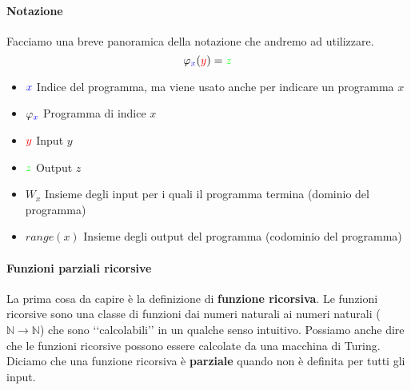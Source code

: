 \documentclass[a4paper,oneside]{scrbook}
\newcommand{\blue}[1]{\textcolor{blue}{#1}}
\begin{document}
\paragraph{Notazione}
Facciamo una breve panoramica della notazione che andremo ad utilizzare.
$$\varphi_{\textcolor{blue}{x}}(\textcolor{red}{y})=\textcolor{green}{z}$$
\begin{itemize}
    \item $\blue{x}$ Indice del programma, ma viene usato anche per indicare un programma $x$
    \item $\varphi_{\blue{x}}$ Programma di indice $x$
    \item $\textcolor{red}{y}$ Input $y$
    \item $\textcolor{green}{z}$ Output $z$
    \item $W_x$ Insieme degli input per i quali il programma termina (dominio del programma)
    \item $range(x)$ Insieme degli output del programma (codominio del programma)
\end{itemize}

\paragraph{Funzioni parziali ricorsive}
La prima cosa da capire è la definizione di \textbf{funzione ricorsiva}. Le funzioni ricorsive sono una classe di funzioni dai 
numeri naturali ai numeri naturali ($\mathbb{N}\rightarrow\mathbb{N}$) che sono ‘‘calcolabili’’ in un qualche senso intuitivo.
Possiamo anche dire che le funzioni ricorsive possono essere calcolate da una macchina di Turing.
Diciamo che una funzione ricorsiva è \textbf{parziale} quando non è definita per tutti gli input.
\end{document}
